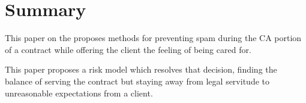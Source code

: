 \section*{Summary}

This paper on the proposes methods for preventing spam during the CA
portion of a contract while offering the client the feeling of being cared for.


This paper proposes a risk model which resolves that decision, finding
the balance of serving the contract but staying away from legal servitude to
unreasonable expectations from a client.


\cleardoublepage